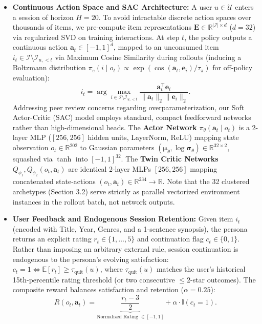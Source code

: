 \documentclass{article}
\begin{document}
\begin{itemize}
    \item \textbf{Continuous Action Space and SAC Architecture:} A user $u \in \mathcal{U}$ enters a session of horizon $H = 20$. To avoid intractable discrete action spaces over thousands of items, we pre-compute item representations $\mathbf{E} \in \mathbb{R}^{|\mathcal{I}| \times d}$ ($d=32$) via regularized SVD on training interactions. At step $t$, the policy outputs a continuous action $\bm{a}_t \in [-1, 1]^d$, mapped to an unconsumed item $i_t \in \mathcal{I} \setminus \mathcal{I}_{u, <t}$ via Maximum Cosine Similarity during rollouts (inducing a Boltzmann distribution $\pi_e(i \mid o_t) \propto \exp(\cos(\bm{a}_t, \bm{e}_i)/\tau_{\pi})$ for off-policy evaluation):
    \begin{equation}
        i_t = \arg\max_{i \in \mathcal{I} \setminus \mathcal{I}_{u, <t}} \frac{\bm{a}_t^\top \bm{e}_i}{\|\bm{a}_t\|_2 \|\bm{e}_i\|_2}.
    \end{equation}
    Addressing peer review concerns regarding overparameterization, our Soft Actor-Critic (SAC) model employs standard, compact feedforward networks rather than high-dimensional heads. The \textbf{Actor Network} $\pi_{\theta}(\bm{a}_t \mid o_t)$ is a 2-layer MLP ($[256, 256]$ hidden units, LayerNorm, ReLU) mapping state observation $o_t \in \mathbb{R}^{202}$ to Gaussian parameters $(\bm{\mu}_{\theta}, \log \bm{\sigma}_{\theta}) \in \mathbb{R}^{32 \times 2}$, squashed via $\tanh$ into $[-1, 1]^{32}$. The \textbf{Twin Critic Networks} $Q_{\phi_1}, Q_{\phi_2}(o_t, \bm{a}_t)$ are identical 2-layer MLPs $[256, 256]$ mapping concatenated state-actions $(o_t, \bm{a}_t) \in \mathbb{R}^{234} \to \mathbb{R}$. Note that the 32 clustered archetypes (Section 3.2) serve strictly as parallel vectorized environment instances in the rollout batch, not network outputs.
    \item \textbf{User Feedback and Endogenous Session Retention:} Given item $i_t$ (encoded with Title, Year, Genres, and a 1-sentence synopsis), the persona returns an explicit rating $r_t \in \{1, \dots, 5\}$ and continuation flag $c_t \in \{0, 1\}$. Rather than imposing an arbitrary external rule, session continuation is endogenous to the persona's evolving satisfaction: $c_t = 1 \iff \mathbb{E}[r_t] \ge \tau_{\text{quit}}(u)$, where $\tau_{\text{quit}}(u)$ matches the user's historical 15th-percentile rating threshold (or two consecutive $\le 2$-star outcomes). The composite reward balances satisfaction and retention ($\alpha = 0.25$):
    \begin{equation}
        R(o_t, \bm{a}_t) = \underbrace{\frac{r_t - 3}{2}}_{\text{Normalized Rating } \in [-1, 1]} + \alpha \cdot \mathbb{I}(c_t = 1).
    \end{equation}
\end{itemize}
\end{document}
